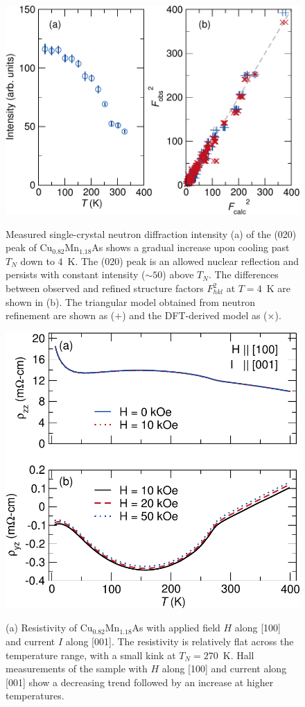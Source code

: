 \documentclass[letterpaper,10pt,doublespacing,edeposit]{uiucthesis2020}
\begin{document}
\begin{mainmatter}
\begin{figure}
\centering\includegraphics[width=0.6\columnwidth]{figures/ch5/hb3a_op-fobs_modified_by_manohar_cropped.pdf} \\
\caption{\label{fig:hb3a}
Measured single-crystal neutron diffraction intensity (a) of the (020) peak of Cu$_{0.82}$Mn$_{1.18}$As shows a gradual increase upon cooling past $T_N$ down to 4~K. The (020) peak is an allowed nuclear reflection and persists with constant intensity ($\sim 50$) above $T_N$. The differences between observed and refined structure factors $F_{hkl}^2$ at $T=4$~K are shown in (b). The triangular model obtained from neutron refinement are shown as ($+$) and the DFT-derived model as ($\times$).
} 
\end{figure}

\begin{figure}
\centering\includegraphics[width=0.6\columnwidth]{figures/ch5/resistivity_data_hall_cropped.pdf} \\
\caption{\label{fig:res-data}
(a) Resistivity of Cu$_{0.82}$Mn$_{1.18}$As with applied field $H$ along [100] and current $I$ along [001]. The resistivity is relatively flat across the temperature range, with a small kink at $T_N = 270$~K. Hall measurements of the sample with $H$ along [100] and current along [001] show a decreasing trend followed by an increase at higher temperatures. 
}
\end{figure}


\end{mainmatter}
\end{document}
